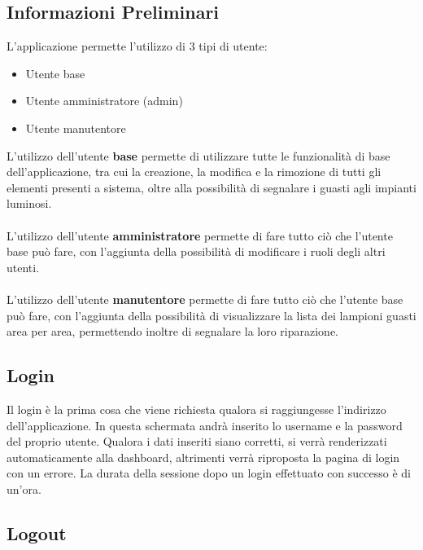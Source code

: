 \documentclass[a4paper, 12pt]{article}
\begin{document}
\subsection{Informazioni Preliminari}
L'applicazione permette l'utilizzo di 3 tipi di utente:
\begin{itemize}
    \item Utente base
    \item Utente amministratore (admin)
    \item Utente manutentore
\end{itemize}
L'utilizzo dell'utente \textbf{base} permette di utilizzare tutte le funzionalità di base dell'applicazione, tra cui la creazione, la modifica e la rimozione di tutti gli elementi presenti a sistema, oltre alla possibilità di segnalare i guasti agli impianti luminosi.\\ \\
L'utilizzo dell'utente \textbf{amministratore} permette di fare tutto ciò che l'utente base può fare, con l'aggiunta della possibilità di modificare i ruoli degli altri utenti.\\ \\
L'utilizzo dell'utente \textbf{manutentore} permette di fare tutto ciò che l'utente base può fare, con l'aggiunta della possibilità di visualizzare la lista dei lampioni guasti area per area, permettendo inoltre di segnalare la loro riparazione.

\subsection{Login}
Il login è la prima cosa che viene richiesta qualora si raggiungesse l'indirizzo dell'applicazione. In questa schermata andrà inserito lo username e la password del proprio utente. Qualora i dati inseriti siano corretti, si verrà renderizzati automaticamente alla dashboard, altrimenti verrà riproposta la pagina di login con un errore. La durata della sessione dopo un login effettuato con successo è di un'ora.

\subsection{Logout}
La funzionalità di logout permette di terminare la sessione generata da un precedente login non ancora scaduto. Il pulsante per il logout è posizionato nella dashboard nell'angolo in alto a destra.
\end{document}
